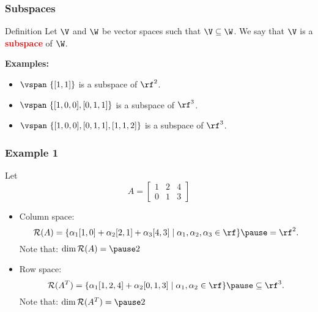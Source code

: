 \begin{frame}
  \frametitle{Subspaces}

  \begin{block}{Definition}
    Let $\V$ and $\W$ be vector spaces such that $\V\subseteq\W$.  We
    say that $\V$ is a \textcolor{red}{\bf subspace} of $\W$.
  \end{block}

  \pause

  {\bf Examples:}
  \begin{itemize}
  \item $\vspan~\{[1,1]\}$ is a subspace of $\rf^2$.
  \item $\vspan~\{[1,0,0],[0,1,1]\}$ is a subspace of $\rf^3$.
  \item $\vspan~\{[1,0,0],[0,1,1],[1,1,2]\}$ is a subspace of $\rf^3$.
  \end{itemize}
\end{frame}

\begin{frame}
  \frametitle{Example 1}

  Let
  \[
  A =
  \begin{bmatrix}
    1 & 2 & 4 \\
    0 & 1 & 3
  \end{bmatrix}
  \]

  \vspace{0.2in}
  
  \pause
  \begin{itemize}
  \item Column space:
    \[
      {\mathcal R}(A) =
      \{
      \alpha_1[1,0] + \alpha_2[2,1] +\alpha_3[4,3] \;|\; \alpha_1,\alpha_2,\alpha_3\in\rf
      \}
      \pause
      = \rf^2.
      \]
      Note that: $\dim {\mathcal R}(A) = \pause 2$ \pause
    \item Row space:
    \[
      {\mathcal R}(A^T) =
      \{
      \alpha_1[1,2,4] + \alpha_2[0,1,3] \;|\; \alpha_1,\alpha_2\in\rf
      \}
      \pause
      \subseteq \rf^3.
      \]
      Note that: $\dim {\mathcal R}(A^T) = \pause 2$
  \end{itemize}
\end{frame}

